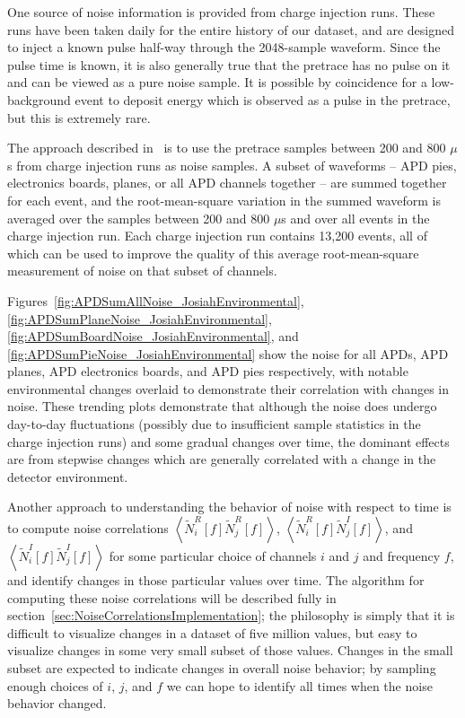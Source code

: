 One source of noise information is provided from charge injection runs.  These runs have been taken daily for the entire history of our dataset, and are designed to inject a known pulse half-way through the 2048-sample waveform.  Since the pulse time is known, it is also generally true that the pretrace has no pulse on it and can be viewed as a pure noise sample.  It is possible by coincidence for a low-background event to deposit energy which is observed as a pulse in the pretrace, but this is extremely rare.

The approach described in~\cite{JosiahCoherentAPDNoise} is to use the pretrace samples between 200 and 800 $\mu$s from charge injection runs as noise samples.  A subset of waveforms -- APD pies, electronics boards, planes, or all APD channels together -- are summed together for each event, and the root-mean-square variation in the summed waveform is averaged over the samples between 200 and 800 $\mu$s and over all events in the charge injection run.  Each charge injection run contains 13,200 events, all of which can be used to improve the quality of this average root-mean-square measurement of noise on that subset of channels.

Figures~\ref{fig:APDSumAllNoise_JosiahEnvironmental}, \ref{fig:APDSumPlaneNoise_JosiahEnvironmental}, \ref{fig:APDSumBoardNoise_JosiahEnvironmental}, and \ref{fig:APDSumPieNoise_JosiahEnvironmental} show the noise for all APDs, APD planes, APD electronics boards, and APD pies respectively, with notable environmental changes overlaid to demonstrate their correlation with changes in noise.  These trending plots demonstrate that although the noise does undergo day-to-day fluctuations (possibly due to insufficient sample statistics in the charge injection runs) and some gradual changes over time, the dominant effects are from stepwise changes which are generally correlated with a change in the detector environment.

Another approach to understanding the behavior of noise with respect to time is to compute noise correlations $\left<\widetilde{N}^R_i[f]\widetilde{N}^R_j[f]\right>$, $\left<\widetilde{N}^R_i[f]\widetilde{N}^I_j[f]\right>$, and $\left<\widetilde{N}^I_i[f]\widetilde{N}^I_j[f]\right>$ for some particular choice of channels $i$ and $j$ and frequency $f$, and identify changes in those particular values over time.  The algorithm for computing these noise correlations will be described fully in section~\ref{sec:NoiseCorrelationsImplementation}; the philosophy is simply that it is difficult to visualize changes in a dataset of five million values, but easy to visualize changes in some very small subset of those values.  Changes in the small subset are expected to indicate changes in overall noise behavior; by sampling enough choices of $i$, $j$, and $f$ we can hope to identify all times when the noise behavior changed.


